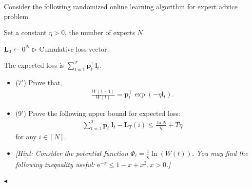 ﻿\documentclass[11pt]{article}
\newenvironment{problem}[2][Problem]{\begin{trivlist}
\item[\hskip \labelsep {\bfseries #1}\hskip \labelsep {\bfseries #2.}]}{\hfill$\blacktriangleleft$\end{trivlist}}
\begin{document}
\begin{problem}{3 (16')} Consider the following randomized online learning algorithm for expert advice problem.
\begin{algorithm}[htbp]
    \caption{Randomized online learning algorithm for expert advice}
    Set a constant $\eta>0$, the number of experts $N$

    $\bm{L}_0\gets 0^N$ \hfill{$\triangleright$ Cumulative loss vector.}

\end{algorithm}

The expected loss is $\sum_{t=1}^T\bm{p}_t^\top\bm{l}_t$. 
\begin{itemize}
    \item [(1)] (7') Prove that, 
    \begin{align*}
        \frac{W(t+1)}{W(t)}=\bm{p}_t^\top\exp(-\eta\bm{l}_t).
    \end{align*}
    \item [(2)] (9') Prove the following upper bound for expected loss:
    \begin{align*}
        \sum_{t=1}^T\bm{p}_t^\top\bm{l}_t-\bm L_T(i)\leq\frac{\ln N}{\eta}+T\eta
    \end{align*}
    for any $i\in[N]$.
    \item [] \textit{[Hint: Consider the potential function $\Phi_t=\frac{1}{\eta}\ln(W(t))$. You may find the following inequality useful: $\mathrm{e}^{-x}\leq 1-x+x^2,x>0$.]}
\end{itemize}
\end{problem}
\end{document}
